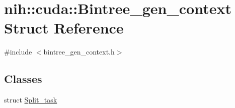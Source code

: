 \hypertarget{structnih_1_1cuda_1_1_bintree__gen__context}{
\section{nih\-:\-:cuda\-:\-:\-Bintree\-\_\-gen\-\_\-context \-Struct \-Reference}
\label{structnih_1_1cuda_1_1_bintree__gen__context}
}


{\ttfamily \#include $<$bintree\-\_\-gen\-\_\-context.\-h$>$}

\subsection*{\-Classes}
\begin{DoxyCompactItemize}
\item 
struct \hyperlink{structnih_1_1cuda_1_1_bintree__gen__context_1_1_split__task}{\-Split\-\_\-task}
\end{DoxyCompactItemize}
